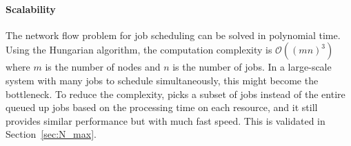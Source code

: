 \paragraph{Scalability}
The network flow problem for job scheduling can be solved in polynomial time. Using the Hungarian algorithm, the computation complexity is $\mathcal{O}((mn)^3)$ where $m$ is the number of nodes and $n$ is the number of jobs. In a large-scale system with many jobs to schedule simultaneously, this might become the bottleneck.
To reduce the complexity, \name picks a subset of jobs instead of the entire queued up jobs based on the processing time on each resource, and it still provides similar performance but with much fast speed. This is validated in Section~\ref{sec:N_max}.

